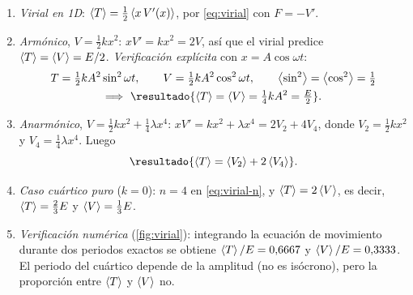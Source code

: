 \begin{resolucion}
\begin{enumerate}
  \item \emph{Virial en 1D}: $\left\langle T\right\rangle=\tfrac12\left\langle x\,V'(x)\right\rangle$, por \eqref{eq:virial} con $F=-V'$.
  \item \emph{Armónico}, $V=\tfrac12kx^{2}$: $xV'=kx^{2}=2V$, así que el virial predice
  $\left\langle T\right\rangle=\left\langle V\right\rangle=E/2$. \emph{Verificación explícita} con $x=A\cos\omega t$:
  \begin{gather*}
    T=\tfrac12kA^{2}\sin^{2}\omega t,\qquad V=\tfrac12kA^{2}\cos^{2}\omega t,\qquad
    \prom{\sin^{2}}=\prom{\cos^{2}}=\tfrac12\\
    \Longrightarrow\ \resultado{\prom{T}=\prom{V}=\tfrac14kA^{2}=\tfrac E2}.
  \end{gather*}
  \item \emph{Anarmónico}, $V=\tfrac12kx^{2}+\tfrac14\lambda x^{4}$:
  $xV'=kx^{2}+\lambda x^{4}=2V_{2}+4V_{4}$, donde $V_{2}=\tfrac12kx^{2}$ y $V_{4}=\tfrac14\lambda x^{4}$. Luego
  \[
    \resultado{\prom{T}=\prom{V_{2}}+2\prom{V_{4}}} .
  \]
  \item \emph{Caso cuártico puro} ($k=0$): $n=4$ en \eqref{eq:virial-n}, y
  $\left\langle T\right\rangle=2\left\langle V\right\rangle$, es decir, $\left\langle T\right\rangle=\tfrac23E$ y $\left\langle V\right\rangle=\tfrac13E$.
  \item \emph{Verificación numérica} (\cref{fig:virial}): integrando la ecuación
  de movimiento durante dos periodos exactos se obtiene
  $\left\langle T\right\rangle/E=0{,}6667$ y $\left\langle V\right\rangle/E=0{,}3333$. El periodo del cuártico depende de la amplitud
  (no es isócrono), pero la proporción entre $\left\langle T\right\rangle$ y $\left\langle V\right\rangle$ no.\qedhere
\end{enumerate}
\end{resolucion}

